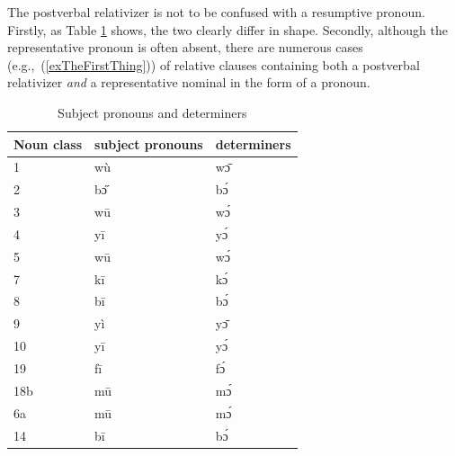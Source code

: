 \documentclass[10pt,twoside]{article}
\def\ci#1{{\ipaFont #1}}
\newcommand{\pref}[1]{(\ref{#1})}
\newcommand{\tref}[1]{Table \ref{#1}}
\def\Hline{\hline}
\begin{document}
The postverbal relativizer is not to be confused with a resumptive pronoun. Firstly, as 
\tref{tabPronounsDeterminers} shows, the two clearly differ in shape.\footnotemark\/
Secondly, although the representative 
pronoun is often absent, there are numerous cases (e.g.,~\pref{exTheFirstThing}) 
of relative clauses containing both a postverbal 
relativizer \emph{and} a representative nominal in the form of a pronoun.

\begin{table}[h!]%
	\centering
	\begin{tabular}[t]{p{3.5cm} l l } \Hline
	Noun class	&	{\sc subject pronouns}		& {\sc determiners}\\
	\Hline
			1		&	\ci{wù}	& \ci{wɔ̄}		\\			
			2		&	\ci{bɔ̋} 	& \ci{bɔ́}		\\
			3		&	\ci{wū}	& \ci{wɔ́}		\\
			4		&	 \ci{yī}	& \ci{yɔ́}		\\
			5		&	\ci{wū}	& \ci{wɔ́}		\\
			7		& 	\ci{kī}	& \ci{kɔ́}		\\
			8		& 	\ci{bī}	& \ci{bɔ́}		\\
			9		& 	\ci{yì}	& \ci{yɔ̄}		\\
			10		& 	\ci{yī}	& \ci{yɔ́}		\\
			19		&	\ci{fī}	& \ci{fɔ́}		\\
			18b		&	\ci{mū}	& \ci{mɔ́}		\\			
			6a		&	\ci{mū}	& \ci{mɔ́}		\\	
			14		& 	\ci{bī}	& \ci{bɔ́}		\\	

	\Hline	
	\end{tabular}
	\caption{Subject pronouns and determiners} \label{tabPronounsDeterminers}
\end{table} 
\end{document}
